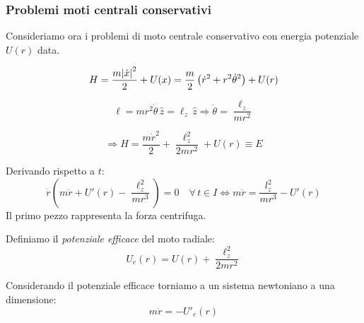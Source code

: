 \subsubsection{Problemi moti centrali conservativi}
Consideriamo ora i problemi di moto centrale conservativo con energia potenziale $U(r )$ data.

\begin{equation*}
    H = \frac{m \abs{\dot{x}}^2}{2} + U(x) = \frac{m}{2} \left( \dot{r}^2 + r^2 \dot{\theta}^2 \right) + U(r)
\end{equation*}

\begin{equation*}
    \ell = m r^2 \dot{\theta} \, \hat{z} = \ell_z \, \hat{z} \Rightarrow \dot{\theta} = \frac{\ell_z}{m r^2}
\end{equation*}

\begin{equation*}
    \Rightarrow H = \frac{m \dot{r}^2}{2} + \frac{\ell_z^2}{2 m r^2} + U(r) \equiv E
\end{equation*}

Derivando rispetto a $t$:
\begin{equation*}
    \dot{r} \left( m \ddot{r} + U'(r) - \frac{\ell_z^2}{m r^3} \right) = 0 \quad \forall\, t \in I
    \iff m\ddot{r}= \frac{l_z^2}{mr^3}-U'(r  )
\end{equation*}
Il primo pezzo rappresenta la forza centrifuga.

\begin{definition}
    Definiamo il \textit{potenziale efficace } del moto radiale:
    \begin{equation}
        U_e(r)= U(r ) + \frac{\ell_z^2}{2mr^2}
    \end{equation}
\end{definition}
Considerando il potenziale efficace torniamo a un sistema newtoniano a una dimensione:
\begin{equation}
    m\ddot{r}= - U'_e   (r )    
\end{equation}

